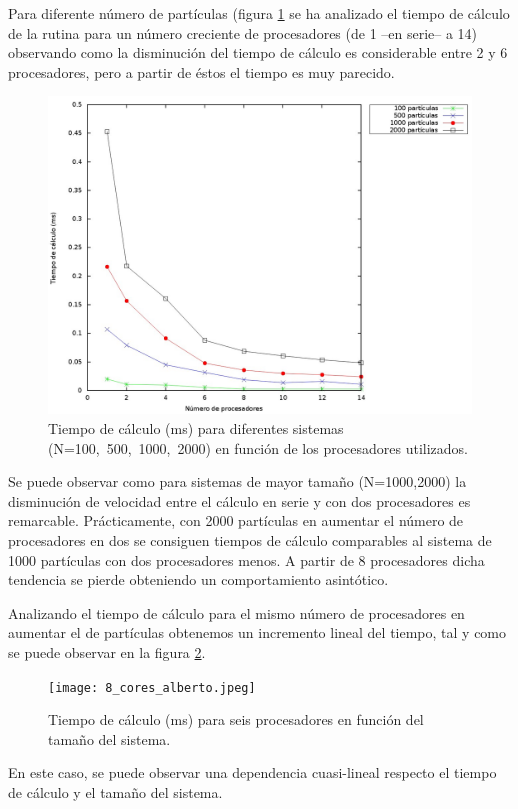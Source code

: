 \documentclass[onecolumn]{article}
\begin{document}
Para diferente número de partículas (figura \ref{fig: comparacion cores alberto} se ha analizado el tiempo de cálculo de la rutina para un número creciente de procesadores (de 1 --en serie-- a 14) observando como la disminución del tiempo de cálculo es considerable entre 2 y 6 procesadores, pero a partir de éstos el tiempo es muy parecido.
\begin{figure}
\includegraphics[scale=0.25]{velos_calc_alberto.jpeg} 
\caption{Tiempo de cálculo (ms) para diferentes sistemas (N=100,\ 500,\ 1000,\ 2000) en función de los procesadores utilizados.} 
\label{fig: comparacion cores alberto}
\end{figure}

Se puede observar como para sistemas de mayor tamaño (N=1000,2000) la disminución de velocidad entre el cálculo en serie y con dos procesadores es remarcable. Prácticamente, con 2000 partículas en aumentar el número de procesadores en dos se consiguen tiempos de cálculo comparables al sistema de 1000 partículas con dos procesadores menos. A partir de 8 procesadores dicha tendencia se pierde obteniendo un comportamiento asintótico.

Analizando el tiempo de cálculo para el mismo número de procesadores en aumentar el de partículas obtenemos un incremento lineal del tiempo, tal y como se puede observar en la figura \ref{fig: comparacionparticulasalberto}.
\begin{figure}[h!]
\texttt{[image: 8\_cores\_alberto.jpeg]} 
\caption{Tiempo de cálculo (ms) para seis procesadores en función del tamaño del sistema.} 
\label{fig: comparacionparticulasalberto}
\end{figure}
En este caso, se puede observar una dependencia cuasi-lineal respecto el tiempo de cálculo y el tamaño del sistema.
\end{document}
